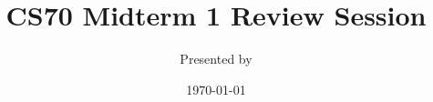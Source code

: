 

\title{CS70 Midterm 1 Review Session}
\author{Presented by }
\date{\today}

\newcommand{\SlideAccessingLogistics}{@\#}





%






